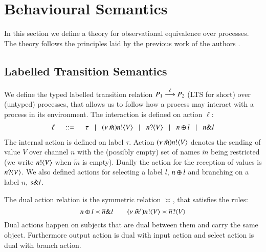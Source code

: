 \section{Behavioural Semantics}
\label{sec:beh_sem}

In this section we define a theory for observational equivalence over
\HOp processes. The theory follows the principles
laid by the previous work of the authors
\cite{DBLP:conf/forte/KouzapasYH11,KY13,dkphdthesis,DBLP:journals/iandc/PerezCPT14}.



\subsection{Labelled Transition Semantics}\label{ss:lts}

We define the typed labelled transition relation
$P_1 \stackrel{\ell}{\longrightarrow} P_2$ (LTS for short) over
(untyped) processes, that allows us to follow how a process may
interact with a process in its environment. The interaction
is defined on action $\ell$:
%
\[
	\begin{array}{rcl}
		\ell	& \;\;::=\;\;  & \tau 
		\;\;\;|\;\;\; (\nu\ \tilde{m}) n ! \langle V \rangle 
		\;\;\;|\;\;\;n ? \langle V \rangle 
		\;\;\;|\;\;\; n \oplus l 
		\;\;\;|\;\;\; n \& l 
	\end{array}
\]
%
\noi The internal action is defined on label $\tau$.
Action $(\nu\ \tilde{m}) n ! \langle V \rangle$ denotes the sending of value
$V$ over channel $n$ with the (possibly empty) set of names $\tilde{m}$
being restricted (we write $n ! \langle V \rangle$  when $\tilde{m}$ is empty).
Dually the action for the reception of values is 
$n ? \langle V \rangle$.
We also defined actions for selecting a label $l$, $n \oplus l$ and branching on a label
$n$, $s \& l$.

The dual action relation is the symmetric relation $\asymp$, that satisfies the rules:
%
\[
	n \oplus l \asymp \overline{n} \& l
	\qquad
	(\nu\ \tilde{m}') n ! \langle V \rangle \asymp \overline{n} ? \langle V \rangle
\]
%
Dual actions happen on subjects that are dual between them and carry the same
object. Furthermore output action is dual with input action and 
select action is dual with branch action.




